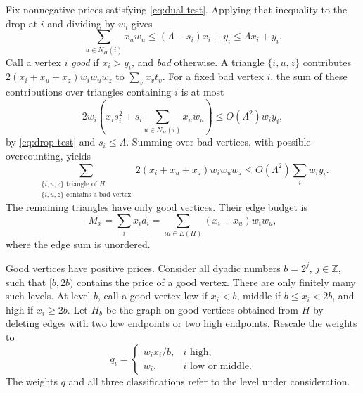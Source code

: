 Fix nonnegative prices satisfying \eqref{eq:dual-test}.  Applying that
inequality to the drop at $i$ and dividing by $w_i$ gives
\begin{equation}
\label{eq:drop-test}
 \sum_{u\in N_H(i)}x_u w_u
             \le(\Lambda-s_i)x_i+y_i\le\Lambda x_i+y_i.
\end{equation}
Call a vertex $i$ \emph{good} if $x_i>y_i$, and \emph{bad} otherwise.
A triangle $\{i,u,z\}$ contributes
$2(x_i+x_u+x_z)w_iw_uw_z$ to $\sum_v x_vt_v$.  For a fixed bad
vertex $i$, the sum of these contributions over triangles containing
$i$ is at most
\[
 2w_i\left(x_i s_i^2+
               s_i\sum_{u\in N_H(i)}x_u w_u\right)
 \le O(\Lambda^2)w_i y_i,
\]
by \eqref{eq:drop-test} and $s_i\le\Lambda$.  Summing over bad
vertices, with possible overcounting, yields
\begin{equation}
\label{eq:bad-triangles}
 \sum_{\substack{\{i,u,z\}\text{ triangle of }H\\
                 \{i,u,z\}\text{ contains a bad vertex}}}
     2(x_i+x_u+x_z)w_iw_uw_z
 \le O(\Lambda^2)\sum_i w_i y_i.
\end{equation}
The remaining triangles have only good vertices.  Their edge budget is
\begin{equation}
\label{eq:price-mass}
 M_x=\sum_i x_i d_i
     =\sum_{iu\in E(H)}(x_i+x_u)w_iw_u,
\end{equation}
where the edge sum is unordered.

Good vertices have positive prices.  Consider all dyadic numbers
$b=2^j$, $j\in\mathbb Z$, such that $[b,2b)$ contains the price of a
good vertex.  There are only finitely many such levels.  At level $b$,
call a good vertex low if $x_i<b$, middle if $b\le x_i<2b$, and high
if $x_i\ge2b$.  Let $H_b$ be the graph on good vertices obtained from
$H$ by deleting edges with two low endpoints or two high endpoints.
Rescale the weights to
\begin{equation}
\label{eq:rescaled-weights}
 q_i=
 \begin{cases}
  w_i x_i/b,&i\text{ high},\\
  w_i,&i\text{ low or middle}.
 \end{cases}
\end{equation}
The weights $q$ and all three classifications refer to the level under
consideration.

